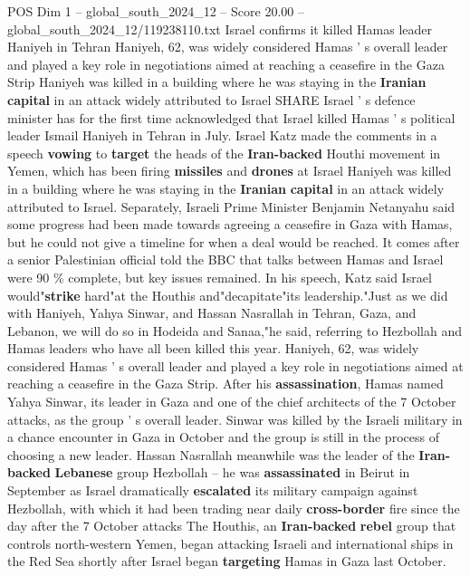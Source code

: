 \begin{textsample}{POS Dim 1 – global\_south\_2024\_12 – Score 20.00 – global\_south\_2024\_12/119238110.txt}  \label{ex:f1_pos_195}
Israel confirms it killed Hamas leader Haniyeh in Tehran Haniyeh, 62, was widely considered Hamas ' s overall leader and played a key role in negotiations aimed at reaching a ceasefire in the Gaza Strip Haniyeh was killed in a building where he was staying in the \textbf{Iranian} \textbf{capital} in an attack widely attributed to Israel SHARE Israel ' s defence minister has for the first time acknowledged that Israel killed Hamas ' s political leader Ismail Haniyeh in Tehran in July.
Israel Katz made the comments in a speech \textbf{vowing} to \textbf{target} the heads of the \textbf{Iran-backed} Houthi movement in Yemen, which has been firing \textbf{missiles} and \textbf{drones} at Israel Haniyeh was killed in a building where he was staying in the \textbf{Iranian} \textbf{capital} in an attack widely attributed to Israel.
Separately, Israeli Prime Minister Benjamin Netanyahu said some progress had been made towards agreeing a ceasefire in Gaza with Hamas, but he could not give a timeline for when a deal would be reached.
It comes after a senior Palestinian official told the BBC that talks between Hamas and Israel were 90 \% complete, but key issues remained.
In his speech, Katz said Israel would"\textbf{strike} hard"at the Houthis and"decapitate"its leadership."Just as we did with Haniyeh, Yahya Sinwar, and Hassan Nasrallah in Tehran, Gaza, and Lebanon, we will do so in Hodeida and Sanaa,"he said, referring to Hezbollah and Hamas leaders who have all been killed this year.
Haniyeh, 62, was widely considered Hamas ' s overall leader and played a key role in negotiations aimed at reaching a ceasefire in the Gaza Strip.
After his \textbf{assassination}, Hamas named Yahya Sinwar, its leader in Gaza and one of the chief architects of the 7 October attacks, as the group ' s overall leader.
Sinwar was killed by the Israeli military in a chance encounter in Gaza in October and the group is still in the process of choosing a new leader.
Hassan Nasrallah meanwhile was the leader of the \textbf{Iran-backed} \textbf{Lebanese} group Hezbollah -- he was \textbf{assassinated} in Beirut in September as Israel dramatically \textbf{escalated} its military campaign against Hezbollah, with which it had been trading near daily \textbf{cross-border} fire since the day after the 7 October attacks The Houthis, an \textbf{Iran-backed} \textbf{rebel} group that controls north-western Yemen, began attacking Israeli and international ships in the Red Sea shortly after Israel began \textbf{targeting} Hamas in Gaza last October.

\end{textsample}
